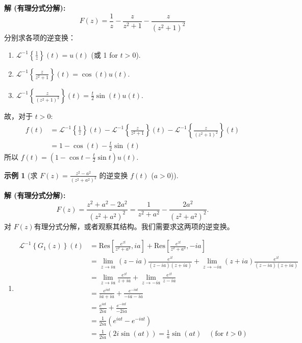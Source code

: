 \documentclass[linespread=1.5,openany]{book}%
\theoremstyle{plain}
\newtheorem{example}[theorem]{示例}
\begin{document}
{{{{{{{									
									\noindent\textbf{解 (有理分式分解):} \\
									\[ F(z) = \frac{1}{z} - \frac{z}{z^2+1} - \frac{z}{(z^2+1)^2} \]
									分别求各项的逆变换：
									\begin{enumerate}
										\item $\mathcal{L}^{-1}\left\{\frac{1}{z}\right\}(t) = u(t)$ (或 1 for $t>0$).
										\item $\mathcal{L}^{-1}\left\{\frac{z}{z^2+1}\right\}(t) = \cos(t)u(t)$.
										\item $\mathcal{L}^{-1}\left\{\frac{z}{(z^2+1)^2}\right\}(t) = \frac{t}{2}\sin(t)u(t)$.
									\end{enumerate}
									故，对于 $t>0$:
									\begin{align*}
										f(t) &= \mathcal{L}^{-1}\left\{\frac{1}{z}\right\}(t) - \mathcal{L}^{-1}\left\{\frac{z}{z^2+1}\right\}(t) - \mathcal{L}^{-1}\left\{\frac{z}{(z^2+1)^2}\right\}(t) \\[6pt]
										&= 1 - \cos(t) - \frac{t}{2}\sin(t)
									\end{align*}
									所以 $f(t) = \left(1 - \cos t - \frac{t}{2}\sin t\right)u(t)$.
									
									
									\vspace{\baselineskip}
									\begin{example}[求 $F(z) = \frac{z^2-a^2}{(z^2+a^2)^2}$ 的逆变换 $f(t)$ ($a>0$)] \label{ex:L16_inv_laplace_ex10_spaced}
									\end{example}
									\noindent\textbf{解 (有理分式分解):} 
									\[	
									F(z) = \frac{z^2+a^2-2a^2}{(z^2+a^2)^2} = \frac{1}{z^2+a^2} - \frac{2a^2}{(z^2+a^2)^2}.	
									\]
									对 $F(z)$有理分式分解，或者观察其结构。我们需要求这两项的逆变换。
									\begin{enumerate}
										\item \begin{align*}
											\mathcal{L}^{-1}\left\{G_1(z)\right\}(t) &= \text{Res}\left[\frac{e^{zt}}{z^2+a^2}, ia\right] + \text{Res}\left[\frac{e^{zt}}{z^2+a^2}, -ia\right] \\[6pt]
											&= \lim_{z\to ia} (z-ia)\frac{e^{zt}}{(z-ia)(z+ia)} + \lim_{z\to -ia} (z+ia)\frac{e^{zt}}{(z-ia)(z+ia)} \\[6pt]
											&= \lim_{z\to ia} \frac{e^{zt}}{z+ia} + \lim_{z\to -ia} \frac{e^{zt}}{z-ia} \\[6pt]
											&= \frac{e^{iat}}{ia+ia} + \frac{e^{-iat}}{-ia-ia} \\[6pt]
											&= \frac{e^{iat}}{2ia} + \frac{e^{-iat}}{-2ia} \\[6pt]
											&= \frac{1}{2ia}(e^{iat} - e^{-iat}) \\[6pt]
											&= \frac{1}{2ia}(2i\sin(at)) = \frac{1}{a}\sin(at) \quad (\text{for } t>0)
										\end{align*}
										

\end{enumerate}}}}}}}}
\end{document}
